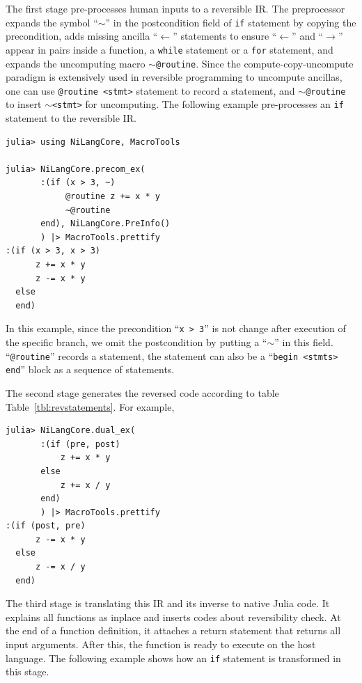 \documentclass[aps,twocolumn,longbibliography,english,superscriptaddress]{revtex4-1}
\newcommand{\<}{\langle}
\renewcommand{\>}{\rangle}
\newcommand{\Tbl}[1]{Table~\ref{#1}}
\theoremstyle{definition}\newtheorem{definition}{\textit{Definition}}
\begin{document}
The first stage pre-processes human inputs to a reversible IR.
The preprocessor expands the symbol ``\texttt{$\sim$}'' in the postcondition field of \texttt{if} statement by copying the precondition, adds missing ancilla ``$\leftarrow$'' statements to ensure ``\texttt{$\leftarrow$}'' and ``\texttt{$\rightarrow$}'' appear in pairs inside a function, a \texttt{while} statement or a \texttt{for} statement, and expands the uncomputing macro \texttt{$\sim$@routine}.
Since the compute-copy-uncompute paradigm is extensively used in reversible programming to uncompute ancillas, one can use \texttt{@routine <stmt>} statement to record a statement, and \texttt{$\sim$@routine} to insert \texttt{$\sim$<stmt>} for uncomputing.
The following example pre-processes an \texttt{if} statement to the reversible IR.

\begin{minipage}{.44\textwidth}
\begin{lstlisting}
julia> using NiLangCore, MacroTools

julia> NiLangCore.precom_ex(
       :(if (x > 3, ~)
            @routine z += x * y
            ~@routine
       end), NiLangCore.PreInfo()
       ) |> MacroTools.prettify
:(if (x > 3, x > 3)
      z += x * y
      z -= x * y
  else
  end)
\end{lstlisting}
\end{minipage}

In this example, since the precondition ``\texttt{x > 3}'' is not change after execution of the specific branch, we omit the postcondition by putting a ``$\sim$'' in this field. ``\texttt{@routine}'' records a statement, the statement can also be a ``\texttt{begin <stmts> end}'' block as a sequence of statements.

The second stage generates the reversed code according to table \Tbl{tbl:revstatements}. For example,

\begin{minipage}{.44\textwidth}
\begin{lstlisting}
julia> NiLangCore.dual_ex(
       :(if (pre, post)
           z += x * y
       else
           z += x / y
       end)
       ) |> MacroTools.prettify
:(if (post, pre)
      z -= x * y
  else
      z -= x / y
  end)
\end{lstlisting}
\end{minipage}

The third stage is translating this IR and its inverse to native Julia code. It explains all functions as inplace and inserts codes about reversibility check. At the end of a function definition, it attaches a return statement that returns all input arguments.
After this, the function is ready to execute on the host language.
The following example shows how an \texttt{if} statement is transformed in this stage.
\end{document}
